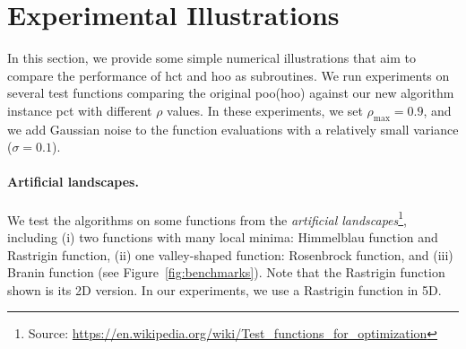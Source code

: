 \section{Experimental Illustrations}\label{sec:gpo.experiments}

In this section, we provide some simple numerical illustrations that aim to compare the performance of \gls{hct} and \gls{hoo} as subroutines. We run experiments on several test functions comparing the original \gls{poo}(\gls{hoo}) against our new algorithm instance \gls{pct} with different $\rho$ values. In these experiments, we set $\rho_{\max} = 0.9$, and we add Gaussian noise to the function evaluations with a relatively small variance ($\sigma=0.1$).

\paragraph{Artificial landscapes.}
We test the algorithms on some functions from the \emph{artificial landscapes}\footnote{Source: \url{https://en.wikipedia.org/wiki/Test_functions_for_optimization}}, including (i) two functions with many local minima: Himmelblau function and Rastrigin function, (ii) one valley-shaped function: Rosenbrock function, and (iii) Branin function (see Figure~\ref{fig:benchmarks}). Note that the Rastrigin function shown is its 2D version. In our experiments, we use a Rastrigin function in 5D.

